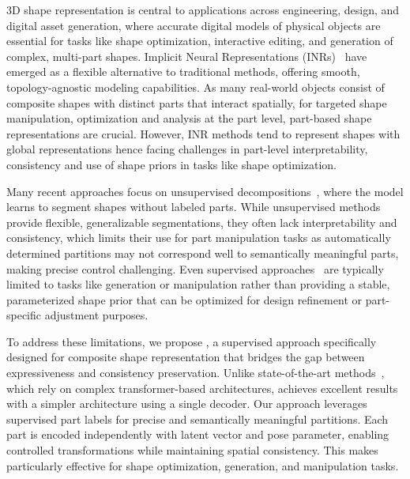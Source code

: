 
3D shape representation is central to applications across engineering, design, and digital asset generation, where accurate digital models of physical objects are essential for tasks like shape optimization, interactive editing, and generation of complex, multi-part shapes. Implicit Neural Representations (INRs)~\cite{Park19c, Mescheder19, Chen19c} have emerged as a flexible alternative to traditional methods, offering smooth, topology-agnostic modeling capabilities. As many real-world objects consist of composite shapes with distinct parts that interact spatially, for targeted shape manipulation, optimization and analysis at the part level, part-based shape representations are crucial. However, INR methods tend to represent shapes with global representations hence facing challenges in part-level interpretability, consistency and use of shape priors in tasks like shape optimization.


Many recent approaches focus on unsupervised decompositions~\cite{Hertz22,Wu20c,Chen24b}, where the model learns to segment shapes without labeled parts. While unsupervised methods provide flexible, generalizable segmentations, they often lack interpretability and consistency, which limits their use for part manipulation tasks as automatically determined partitions may not correspond well to semantically meaningful parts, making precise control challenging.  Even supervised approaches~\cite{Deng22b,Li24c}  are typically limited to tasks like generation or manipulation rather than providing a stable, parameterized shape prior that can be optimized for design refinement or part-specific adjustment purposes. 

To address these limitations, we propose \PSDF{}, a supervised approach specifically designed for composite shape representation that bridges the gap between expressiveness and consistency preservation. Unlike state-of-the-art methods~\cite{Deng22b,Hertz22,Li24c}, which rely on complex transformer-based architectures, \PSDF{} achieves excellent results with a simpler architecture using a single decoder. Our approach leverages supervised part labels for precise and semantically meaningful partitions. Each part is encoded independently with latent vector and pose parameter, enabling controlled transformations while maintaining spatial consistency. This makes \PSDF{} particularly effective for shape optimization, generation, and manipulation tasks.

